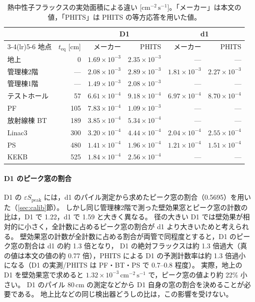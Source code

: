 \documentclass[a4paper,11pt]{ltjsarticle}
\newcommand{\teq}{t_{\mathrm{eq}}}
\newcommand{\eSpk}{\varepsilon S_{\mathrm{peak}}}
\newcommand{\flux}{\mathrm{cm^{-2}\,s^{-1}}}
\begin{document}
\begin{table}[htbp]
  \centering
  \caption{熱中性子フラックスの実効面積による違い [$\flux$]。「メーカー」は本文の値，「PHITS」は PHITS の等方応答を用いた値。}
  \label{tab:fluxphits}
  \small
  \begin{tabular}{lrrrrr}
    \toprule
    & & \multicolumn{2}{c}{D1} & \multicolumn{2}{c}{d1} \\
    \cmidrule(lr){3-4}\cmidrule(lr){5-6}
    地点 & $\teq$ [cm] & メーカー & PHITS & メーカー & PHITS \\
    \midrule
    地上 & 0 & $1.69\times10^{-3}$ & $2.35\times10^{-3}$ & --- & --- \\
    管理棟2階 & --- & $2.08\times10^{-3}$ & $2.89\times10^{-3}$ & $1.81\times10^{-3}$ & $2.27\times10^{-3}$ \\
    管理棟1階 & --- & $1.49\times10^{-3}$ & $2.08\times10^{-3}$ & --- & --- \\
    テストホール & 57 & $6.61\times10^{-4}$ & $9.18\times10^{-4}$ & $6.97\times10^{-4}$ & $8.70\times10^{-4}$ \\
    PF & 105 & $7.83\times10^{-4}$ & $1.09\times10^{-3}$ & --- & --- \\
    放射線棟 BT & 189 & $3.85\times10^{-4}$ & $5.34\times10^{-4}$ & --- & --- \\
    Linac3 & 300 & $3.20\times10^{-4}$ & $4.44\times10^{-4}$ & $2.04\times10^{-4}$ & $2.55\times10^{-4}$ \\
    PS & 480 & $1.41\times10^{-4}$ & $1.96\times10^{-4}$ & $1.21\times10^{-4}$ & $1.51\times10^{-4}$ \\
    KEKB & 525 & $1.84\times10^{-4}$ & $2.56\times10^{-4}$ & --- & --- \\
    \bottomrule
  \end{tabular}
\end{table}

\paragraph{D1 のピーク窓の割合}
D1 の $\eSpk$ には，d1 のパイル測定から求めたピーク窓の割合（0.5695）を用いた（\ref{sec:calib}節）。
しかし同じ管理棟2階で測った壁効果窓とピーク窓の計数の比は，D1 で 1.22，d1 で 1.59 と大きく異なる。
径の大きい D1 では壁効果が相対的に小さく，全計数に占めるピーク窓の割合が d1 より大きいためと考えられる。
壁効果窓の計数が全計数に占める割合が両管で同程度とすると，D1 のピーク窓の割合は d1 の約 1.3 倍となり，
D1 の絶対フラックスは約 1.3 倍過大（真の値は本文の値の約 0.77 倍），PHITS による D1 の予測計数率は約 1.3 倍過小になる（D1 の実測/PHITS は PF・BT・PS で 0.7--0.8 程度）。
実際，地上の D1 を壁効果窓で求めると $1.32\times10^{-3}\,\flux$ で，ピーク窓の値より約 22\% 小さい。
D1 のパイル 80\,cm の測定などから D1 自身の窓の割合を決めることが必要である。
地上比などの同じ検出器どうしの比は，この影響を受けない。
\end{document}
